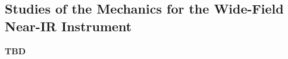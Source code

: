 \def\thisdir{instrument/mechanics/}

\begin{center}
\section{Studies of the Mechanics for the Wide-Field Near-IR Instrument
\label{sec:inst_mechanics}}
\vspace{0.5cm}

\noindent
\large
{\bf TBD}\\
\vspace{0.5cm}

\end{center}


